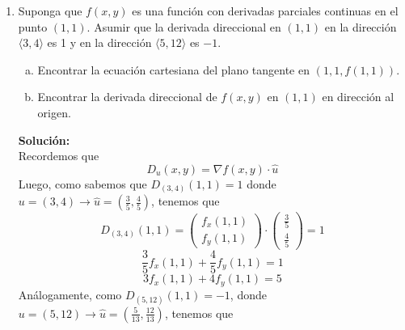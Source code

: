 \documentclass[12pt]{article}
\newenvironment{solucion}
{\begin{mdframed}[backgroundcolor=black!10]
		{\bf Solución:}\\
	}
	{
	\end{mdframed}
}
\newenvironment{preguntas}
{\begin{enumerate}\itemsep12pt
	}
	{
	\end{enumerate}
}
\newcommand{\ra}{\rightarrow}
\begin{document}
\begin{preguntas}
\begin{solucion}
\begin{enumerate}[a)]
$$\begin{pmatrix}
-y^2/x^2 \\
2y/x
\end{pmatrix} \ra 
\nabla f(1,2) = \begin{pmatrix}
-4 \\
4
\end{pmatrix}
$$
Luego, normalicemos $u$, esto es
$$\hat{u} = \dfrac{u}{|u|} = \dfrac{\begin{pmatrix}
2 \\
\sqrt[]{5}
\end{pmatrix}}{3} = \begin{pmatrix}
2/3 \\
\sqrt[]{5}/3
\end{pmatrix}$$
Finalmente,
$$D_u = 
\begin{pmatrix}
-4 \\
4
\end{pmatrix}
\cdot 
\begin{pmatrix}
2/3 \\
\sqrt[]{5}/3
\end{pmatrix} = \dfrac{-8 + 4\ \sqrt[]{5}}{3}$$
\end{enumerate}
\end{solucion}
\item Suponga que $f(x,y)$ es una función con derivadas parciales continuas en el punto $(1,1)$. Asumir que la derivada direccional en $(1,1)$ en la dirección $\langle3,4\rangle$ 			es 1 y en la dirección $\langle5,12\rangle$ es $-1$.
\begin{enumerate}[a)]
\item Encontrar la ecuación cartesiana del plano tangente en $(1,1,f(1,1))$.
\item Encontrar la derivada direccional de $f(x,y)$ en $(1,1)$ en dirección al origen.	
\end{enumerate}
\begin{solucion}
Recordemos que 
$$D_u(x,y) = \nabla f(x,y) \cdot \hat{u}$$
Luego, como sabemos que $D_{(3,4)}(1,1) = 1$ donde $u = (3,4) \ra \hat{u} = (\frac{3}{5}, \frac{4}{5})$, tenemos que
$$D_{(3,4)}(1,1) = \begin{pmatrix}f_x(1,1) \\ f_y(1,1)\end{pmatrix} \cdot \begin{pmatrix}\frac{3}{5} \\ \frac{4}{5}\end{pmatrix} = 1$$
$$\dfrac{3}{5}f_x(1,1) + \dfrac{4}{5}f_y(1,1) = 1$$
$$3f_x(1,1) + 4f_y(1,1) = 5$$
Análogamente, como $D_{(5,12)}(1,1) = -1$, donde $u=(5,12) \ra \hat{u} = (\frac{5}{13}, \frac{12}{13})$, tenemos que

\end{solucion}
\end{preguntas}
\end{document}
